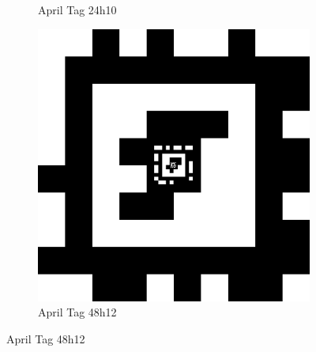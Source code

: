 \begin{figure}[]
\begin{subfigure}[b]{0.2\linewidth}
        \caption{April Tag 24h10}
        \label{figure:apriltag24h10_example}
    \end{subfigure}
    \begin{subfigure}[b]{0.2\linewidth}
        \includegraphics[width=\textwidth]{images/tagCustom48h12_00002_00001_00000}
        \caption{April Tag 48h12}
        \label{figure:apriltag48h12}
    \end{subfigure}


\end{figure}
